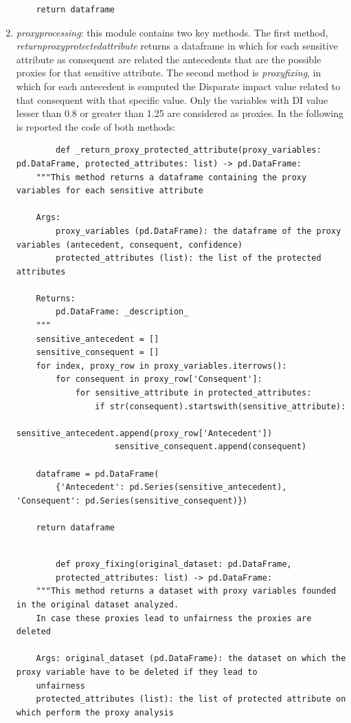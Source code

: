 \documentclass[12pt,a4paper,openright,twoside]{book}
\begin{document}
\begin{enumerate}
\begin{lstlisting}
    return dataframe
    \end{lstlisting}
    \item \emph{proxy\textunderscore processing}: this module contains two key methods. The first method, \emph{\textunderscore return\textunderscore proxy\textunderscore protected\textunderscore attribute} returns a dataframe in which for each sensitive attribute as consequent are related the antecedents that are the possible proxies for that sensitive attribute. The second method is \emph{proxy\textunderscore fixing}, in which for each antecedent is computed the Disparate impact value related to that consequent with that specific value. Only the variables with DI value lesser than 0.8 or greater than 1.25 are considered as proxies. In the following is reported the code of both methods:
    \begin{lstlisting}
        def _return_proxy_protected_attribute(proxy_variables: pd.DataFrame, protected_attributes: list) -> pd.DataFrame:
    """This method returns a dataframe containing the proxy variables for each sensitive attribute

    Args:
        proxy_variables (pd.DataFrame): the dataframe of the proxy variables (antecedent, consequent, confidence)
        protected_attributes (list): the list of the protected attributes

    Returns:
        pd.DataFrame: _description_
    """
    sensitive_antecedent = []
    sensitive_consequent = []
    for index, proxy_row in proxy_variables.iterrows():
        for consequent in proxy_row['Consequent']:
            for sensitive_attribute in protected_attributes:
                if str(consequent).startswith(sensitive_attribute):
                    sensitive_antecedent.append(proxy_row['Antecedent'])
                    sensitive_consequent.append(consequent)

    dataframe = pd.DataFrame(
        {'Antecedent': pd.Series(sensitive_antecedent), 'Consequent': pd.Series(sensitive_consequent)})

    return dataframe


    \end{lstlisting}
    \begin{lstlisting}
        def proxy_fixing(original_dataset: pd.DataFrame, 
        protected_attributes: list) -> pd.DataFrame:
    """This method returns a dataset with proxy variables founded in the original dataset analyzed.
    In case these proxies lead to unfairness the proxies are deleted

    Args: original_dataset (pd.DataFrame): the dataset on which the proxy variable have to be deleted if they lead to
    unfairness
    protected_attributes (list): the list of protected attribute on which perform the proxy analysis


\end{lstlisting}
\end{enumerate}
\end{document}
